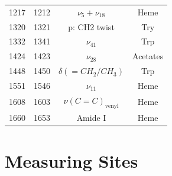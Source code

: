 \begin{table}[]
\begin{center}
\begin{tabular}{cccc}
1217                 & 1212          & $\nu_5 + \nu_{18}$            & Heme                        \\
1320                 & 1321          & p: CH2 twist                  & Try                         \\
1332                 & 1341          & $\nu_{41}$                    & Trp                         \\
1424                 & 1423          & $\nu_{28}$                    & Acetates                    \\
1448                 & 1450          & $\delta(={CH}_{2}/{CH}_{3})$  & Trp                         \\
1551                 & 1546          & $\nu_{11}$                    & Heme                        \\
1608                 & 1603          & $\nu(C=C)_{\text{venyl}}$     & Heme                        \\
1660                 & 1653          & Amide I                       & Heme                        \\
\hline
\end{tabular}
\label{tab:bloodpeak}
\end{center}
\end{table}






\section{Measuring Sites}

